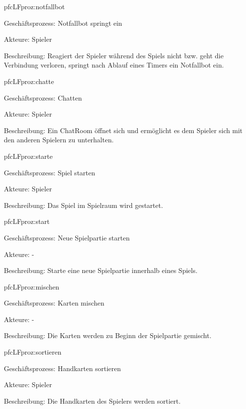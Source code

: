\begin{description}[leftmargin=5em, style=sameline]
	\begin{lhp}{pfc}{LF}{proz:notfallbot}
		\item [Geschäftsprozess:] Notfallbot springt ein
		\item [Akteure:] Spieler
		\item [Beschreibung:] Reagiert der Spieler während des Spiels nicht bzw. geht die Verbindung verloren, springt nach Ablauf eines Timers ein Notfallbot ein.
	\end{lhp}
	
	\begin{lhp}{pfc}{LF}{proz:chatte}
		\item [Geschäftsprozess:] Chatten
		\item [Akteure:] Spieler
		\item [Beschreibung:] Ein ChatRoom öffnet sich und ermöglicht es dem Spieler sich mit den anderen Spielern zu unterhalten.
	\end{lhp}
	
	\begin{lhp}{pfc}{LF}{proz:starte}
		\item [Geschäftsprozess:] Spiel starten
		\item [Akteure:] Spieler
		\item [Beschreibung:] Das Spiel im Spielraum wird gestartet.
	\end{lhp}

	\begin{lhp}{pfc}{LF}{proz:start}
		\item [Geschäftsprozess:] Neue Spielpartie starten
		\item [Akteure:] - 
		\item [Beschreibung:] Starte eine neue Spielpartie innerhalb eines Spiels.
	\end{lhp}

	\begin{lhp}{pfc}{LF}{proz:mischen}
		\item [Geschäftsprozess:] Karten mischen
		\item [Akteure:] -
		\item [Beschreibung:] Die Karten werden zu Beginn der Spielpartie gemischt.
	\end{lhp}
	
	\begin{lhp}{pfc}{LF}{proz:sortieren}
		\item [Geschäftsprozess:] Handkarten sortieren
		\item [Akteure:] Spieler
		\item [Beschreibung:] Die Handkarten des Spielers werden sortiert.
	\end{lhp}


\end{description}

